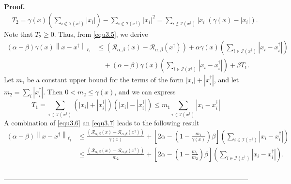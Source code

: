 \documentclass[a4paper,12pt]{article}
\numberwithin{equation}{section}
\newenvironment{proof}[1][Proof]{\textbf{#1.} }
{\ \rule{0.75em}{0.75em}\smallskip}
\begin{document}
\begin{proof}
\begin{align*}
        & T_{2}= \gamma\left(x\right) \left(\sum_{i\notin\mathcal{I}\left(x^{\dagger}\right)}\left|x_{i}\right|\right) -\sum_{i\notin\mathcal{I}\left(x^{\dagger}\right)}\left|x_{i}\right|^{2} =\sum_{i\notin\mathcal{I}\left(x^{\dagger}\right)}\left|x_{i}\right| \left(\gamma\left(x\right)-\left|x_{i} \right|\right).
    \end{align*}
    Note that $T_{2}\geq 0$. Thus, from \eqref{equ3.5}, we derive
    \begin{align}\label{equ3.6}
        \left(\alpha-\beta\right)\gamma\left(x\right)\left\|x-x^{\dagger}\right\|_{\ell_{1}} 
        & \leq \left(\mathcal{R}_{\alpha,\beta}\left(x\right) -\mathcal{R}_{\alpha,\beta}\left(x^{\dagger}\right)\right) +\alpha\gamma\left(x\right)\left(\sum_{i\in\mathcal{I}\left(x^{\dagger}\right)}\left|x_{i}-x_{i}^{\dagger}\right| \right) \nonumber\\
        & \quad +\left(\alpha-\beta\right)\gamma\left(x\right)\left(\sum_{i\in\mathcal{I}\left(x^{\dagger}\right)} \left|x_{i}- x_{i}^{\dagger}\right|\right)+\beta T_{1}.
    \end{align}
    Let $m_{1}$ be a constant upper bound for the terms of the form $\left|x_{i}\right|+ \left|x_{i}^{\dagger}\right|$, and let $m_{2}=\sum_{i}\left|x_{i}^{\dagger}\right|$. Then $0<m_{2}\leq\gamma\left(x\right)$, and we can express
    \begin{equation}\label{equ3.7}
        T_{1}=\sum_{i\in\mathcal{I}\left(x^{\dagger}\right)}\left(\left|x_{i}\right|+ \left|x_{i}^{\dagger}\right|\right)\left(\left|x_{i}\right|- \left|x_{i}^{\dagger}\right|\right) \leq m_{1}\sum_{i\in\mathcal{I}\left(x^{\dagger}\right)}\left|x_{i}- x_{i}^{\dagger}\right|
    \end{equation}
    A combination of \eqref{equ3.6} an \eqref{equ3.7} leads to the following result
    \begin{align}\label{equ3.8}
        \left(\alpha-\beta\right)\left\|x-x^{\dagger}\right\|_{\ell_{1}}
        & \leq \frac{\left(\mathcal{R}_{\alpha,\beta}\left(x\right) -\mathcal{R}_{\alpha,\beta}\left(x^{\dagger}\right)\right)}{\gamma\left(x\right)}+ \left[2\alpha-\left(1-\frac{m_{1}}{\gamma\left(x\right)}\right)\beta\right]\left(\sum_{i\in\mathcal{I} \left(x^{\dagger}\right)}\left|x_{i}-x_{i}^{\dagger}\right|\right) \nonumber\\
        & \leq \frac{\left(\mathcal{R}_{\alpha,\beta}\left(x\right) -\mathcal{R}_{\alpha,\beta}\left(x^{\dagger}\right)\right)}{m_{2}}+ \left[2\alpha-\left(1-\frac{m_{1}}{m_{2}}\right)\beta\right]\left(\sum_{i\in\mathcal{I} \left(x^{\dagger}\right)}\left|x_{i}-x_{i}^{\dagger}\right|\right).

\end{align}
\end{proof}
\end{document}
